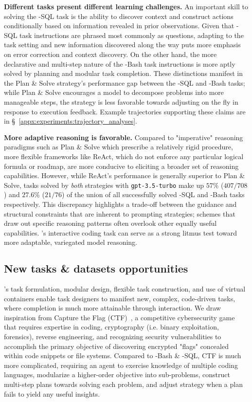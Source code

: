 \textbf{Different tasks present different learning challenges.}
An important skill to solving the \benchmark{}-SQL task is the ability to discover context and construct actions conditionally based on information revealed in prior observations.
Given that \benchmark{}-SQL task instructions are phrased most commonly as questions, adapting to the task setting and new information discovered along the way puts more emphasis on error correction and context discovery.
On the other hand, the more declarative and multi-step nature of the \benchmark{}-Bash task instructions is more aptly solved by planning and modular task completion.
These distinctions manifest in the Plan \& Solve strategy's performance gap between the \benchmark{}-SQL and \benchmark{}-Bash tasks; while Plan \& Solve encourages a model to decompose problems into more manageable steps, the strategy is less favorable towards adjusting on the fly in response to execution feedback.
Example trajectories supporting these claims are in \S~\ref{appx:experiments:trajectory_analyses}.

\textbf{More adaptive reasoning is favorable.}
Compared to "imperative" reasoning paradigms such as Plan \& Solve which prescribe a relatively rigid procedure, more flexible frameworks like ReAct, which do not enforce any particular logical formula or roadmap, are more conducive to eliciting a broader set of reasoning capabilities.
However, while ReAct's performance is generally superior to Plan \& Solve, tasks solved by \textit{both} strategies with \texttt{gpt-3.5-turbo} make up $57\%$ ($407/708$) and $27.6\%$ ($21/76$) of the union of all successfully solved \benchmark{}-SQL and \benchmark{}-Bash tasks respectively.
This discrepancy highlights a trade-off between the guidance and structural constraints that are inherent to prompting strategies; schemes that draw out specific reasoning patterns often overlook other equally useful capabilities.
\benchmark{}'s interactive coding task can serve as a strong litmus test toward more adaptable, variegated model reasoning.

\subsection{New tasks \& datasets opportunities}
\benchmark{}'s task formulation, modular design, flexible task construction, and use of virtual containers enable task designers to manifest new, complex, code-driven tasks, where completion is much more attainable through interaction.
We draw inspiration from Capture the Flag (CTF)~\cite{cowan2003ctf}, a competitive cybersecurity game that requires expertise in coding, cryptography (i.e. binary exploitation, forensics), reverse engineering, and recognizing security vulnerabilities to accomplish the primary objective of discovering encrypted "flags" concealed within code snippets or file systems.
Compared to \benchmark{}-Bash \& -SQL, CTF is much more complicated, requiring an agent to exercise knowledge of multiple coding languages, modularize a higher-order objective into sub-problems, construct multi-step plans towards solving each problem, and adjust strategy when a plan fails to yield any useful insights.

